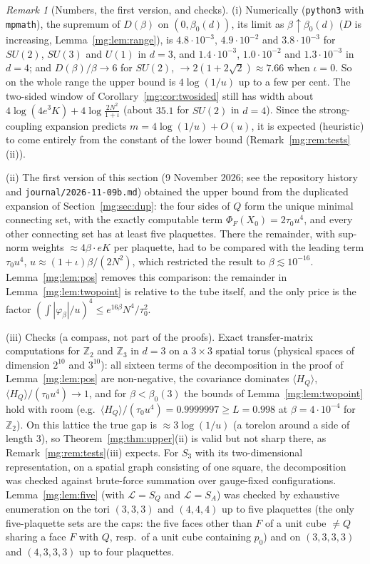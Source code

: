 \documentclass[11pt,a4paper]{article}
\theoremstyle{definition}
\theoremstyle{remark}
\newtheorem{remark}[theorem]{Remark}
\begin{document}
\begin{remark}[Numbers, the first version, and checks]\label{mg:rem:threshold}
(i) Numerically (\texttt{python3} with \texttt{mpmath}), the supremum of $D(\beta)$ on $(0,\beta_0(d))$, its limit as $\beta\uparrow\beta_0(d)$ ($D$ is
increasing, Lemma~\ref{mg:lem:range}),
is $4.8\cdot10^{-3}$, $4.9\cdot10^{-2}$ and $3.8\cdot10^{-3}$ for $SU(2)$, $SU(3)$ and $U(1)$ in $d=3$, and $1.4\cdot10^{-3}$, $1.0\cdot10^{-2}$ and
$1.3\cdot10^{-3}$ in $d=4$; and $D(\beta)/\beta\to6$ for $SU(2)$, $\to2(1+2\sqrt2)\approx7.66$ when $\iota=0$. So on the whole range the
upper bound is $4\log(1/u)$ up to a few per cent. The two-sided window of Corollary~\ref{mg:cor:twosided} still has width about
$4\log(4e^3K)+4\log\frac{2N^2}{1+\iota}$ (about $35.1$ for $SU(2)$ in $d=4$). Since the strong-coupling expansion predicts
$m=4\log(1/u)+O(u)$, it is expected (heuristic) to come entirely from the constant of the lower bound (Remark~\ref{mg:rem:tests}(ii)).

(ii) The first version of this section (9 November 2026; see the repository history and \texttt{journal/2026-11-09b.md}) obtained the upper bound
from the duplicated expansion of Section~\ref{mg:sec:dup}: the four sides of $Q$ form the unique minimal connecting set, with the exactly
computable term $\Phi_F(X_0)=2\tau_0u^4$, and every other connecting set has at least five plaquettes. There the remainder, with
sup-norm weights $\approx4\beta\cdot eK$ per plaquette, had to be compared with the leading term $\tau_0u^4$, $u\approx(1+\iota)\beta/(2N^2)$,
which restricted the result to $\beta\lesssim10^{-16}$. Lemma~\ref{mg:lem:pos} removes this comparison: the remainder in
Lemma~\ref{mg:lem:twopoint} is relative to the tube itself, and the only price is the factor $(\int|\varphi_\beta|/u)^4\le e^{16\beta}N^4/\tau_0^2$.

(iii) Checks (a compass, not part of the proofs). Exact transfer-matrix computations for $\mathbb Z_2$ and $\mathbb Z_3$ in $d=3$ on a $3\times3$
spatial torus (physical spaces of dimension $2^{10}$ and $3^{10}$): all sixteen terms of the decomposition in the proof of
Lemma~\ref{mg:lem:pos} are non-negative, the covariance dominates $\langle H_Q\rangle$, $\langle H_Q\rangle/(\tau_0u^4)\to1$, and for
$\beta<\beta_0(3)$ the bounds of Lemma~\ref{mg:lem:twopoint} hold with room (e.g.\ $\langle H_Q\rangle/(\tau_0u^4)=0.9999997\ge L=0.998$ at
$\beta=4\cdot10^{-4}$ for $\mathbb Z_2$). On this lattice the true gap is $\approx3\log(1/u)$ (a torelon around a side of length $3$), so
Theorem~\ref{mg:thm:upper}(ii) is valid but not sharp there, as Remark~\ref{mg:rem:tests}(iii) expects. For $S_3$ with its two-dimensional
representation, on a spatial graph consisting of one square, the decomposition was checked against brute-force summation over
gauge-fixed configurations. Lemma~\ref{mg:lem:five} (with $\mathcal L=S_Q$ and $\mathcal L=S_A$) was checked by exhaustive enumeration on the tori
$(3,3,3)$ and $(4,4,4)$ up to five plaquettes (the only five-plaquette sets are the caps: the five faces other than $F$ of a unit cube $\ne Q$ sharing a face $F$
with $Q$, resp.\ of a unit cube containing $p_0$) and on $(3,3,3,3)$ and $(4,3,3,3)$ up to four plaquettes.
\end{remark}
\end{document}
